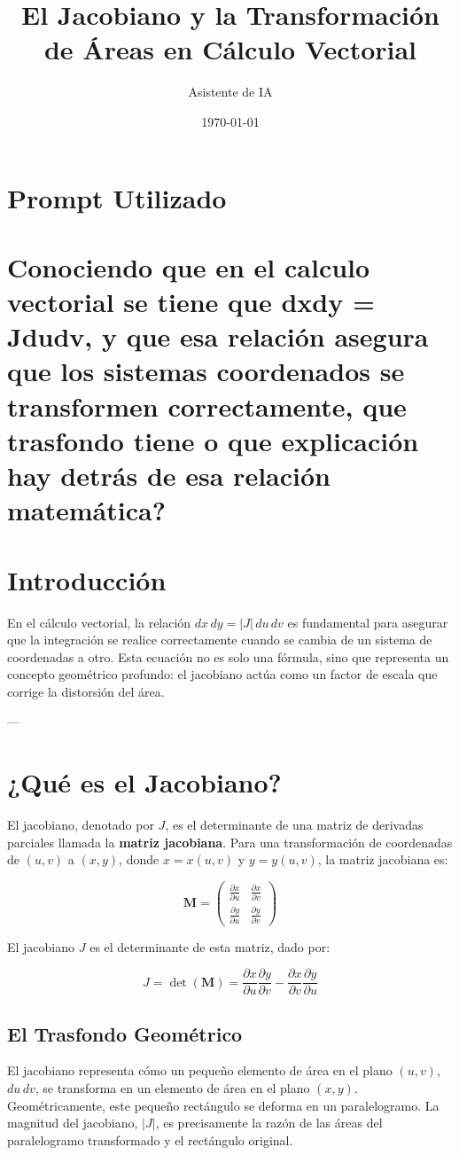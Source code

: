 \documentclass{article}
\title{El Jacobiano y la Transformación de Áreas en Cálculo Vectorial}
\author{Asistente de IA}
\date{\today}
\begin{document}
\maketitle

\section*{Prompt Utilizado}
\section*{Conociendo que en el calculo vectorial se tiene que dxdy = Jdudv, y que esa relación asegura que los sistemas coordenados se transformen correctamente, que trasfondo tiene o que explicación hay detrás de esa relación matemática?}

\section*{Introducción}
En el cálculo vectorial, la relación $dx\,dy = |J|\,du\,dv$ es fundamental para asegurar que la integración se realice correctamente cuando se cambia de un sistema de coordenadas a otro. Esta ecuación no es solo una fórmula, sino que representa un concepto geométrico profundo: el jacobiano actúa como un factor de escala que corrige la distorsión del área.

---

\section*{¿Qué es el Jacobiano?}
El jacobiano, denotado por $J$, es el determinante de una matriz de derivadas parciales llamada la \textbf{matriz jacobiana}. Para una transformación de coordenadas de $(u, v)$ a $(x, y)$, donde $x = x(u, v)$ y $y = y(u, v)$, la matriz jacobiana es:

\[
\mathbf{M} = 
\begin{pmatrix}
\frac{\partial x}{\partial u} & \frac{\partial x}{\partial v} \\
\frac{\partial y}{\partial u} & \frac{\partial y}{\partial v}
\end{pmatrix}
\]

El jacobiano $J$ es el determinante de esta matriz, dado por:

\[
J = \det(\mathbf{M}) = \frac{\partial x}{\partial u} \frac{\partial y}{\partial v} - \frac{\partial x}{\partial v} \frac{\partial y}{\partial u}
\]

\subsection*{El Trasfondo Geométrico}
El jacobiano representa cómo un pequeño elemento de área en el plano $(u, v)$, $du\,dv$, se transforma en un elemento de área en el plano $(x, y)$. Geométricamente, este pequeño rectángulo se deforma en un paralelogramo. La magnitud del jacobiano, $|J|$, es precisamente la razón de las áreas del paralelogramo transformado y el rectángulo original.
\end{document}
